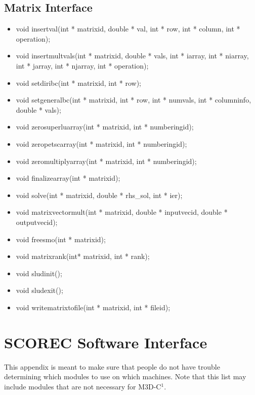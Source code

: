 \section{Matrix Interface}
\begin{itemize}
\item   void insertval(int * matrixid, double * val, int * row,
                   int * column, int * operation);

\item   void insertmultvals(int * matrixid, double * vals, int * iarray,
                       int * niarray, int * jarray, int * njarray,
                       int * operation);

\item   void setdiribc(int * matrixid, int * row);
\item   void setgeneralbc(int * matrixid, int * row, int * numvals,
                     int * columninfo, double * vals);
\item   void zerosuperluarray(int * matrixid, int * numberingid);
\item   void zeropetscarray(int * matrixid, int * numberingid);
\item   void zeromultiplyarray(int * matrixid, int * numberingid);
\item   void finalizearray(int * matrixid);
\item   void solve(int * matrixid, double * rhs\_sol, int * ier);
\item   void matrixvectormult(int * matrixid, double * inputvecid, double * outputvecid);
\item   void freesmo(int * matrixid);
\item   void matrixrank(int* matrixid, int * rank);
\item   void sludinit();
\item   void sludexit();
\item   void writematrixtofile(int * matrixid, int * fileid);
\end{itemize}


\chapter{SCOREC Software Interface}
This appendix is meant to make sure that people do not have trouble determining which modules to use on 
which machines.  Note that this list may include modules that are not necessary for M3D-C$^1$.


